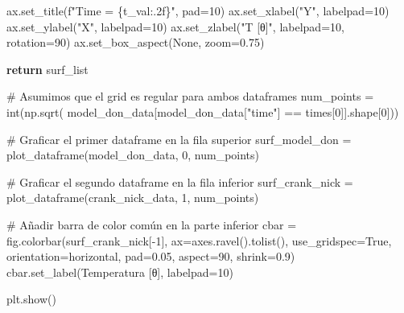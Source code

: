 \documentclass[
  spanish,
  us-letterpaper,
]{scrreprt}
\newenvironment{Shaded}{\begin{snugshade}}{\end{snugshade}}
\newcommand{\BuiltInTok}[1]{\textcolor[rgb]{0.00,0.23,0.31}{#1}}
\newcommand{\CommentTok}[1]{\textcolor[rgb]{0.37,0.37,0.37}{#1}}
\newcommand{\ControlFlowTok}[1]{\textcolor[rgb]{0.00,0.23,0.31}{\textbf{#1}}}
\newcommand{\DecValTok}[1]{\textcolor[rgb]{0.68,0.00,0.00}{#1}}
\newcommand{\FloatTok}[1]{\textcolor[rgb]{0.68,0.00,0.00}{#1}}
\newcommand{\NormalTok}[1]{\textcolor[rgb]{0.00,0.23,0.31}{#1}}
\newcommand{\OperatorTok}[1]{\textcolor[rgb]{0.37,0.37,0.37}{#1}}
\newcommand{\SpecialCharTok}[1]{\textcolor[rgb]{0.37,0.37,0.37}{#1}}
\newcommand{\SpecialStringTok}[1]{\textcolor[rgb]{0.13,0.47,0.30}{#1}}
\newcommand{\StringTok}[1]{\textcolor[rgb]{0.13,0.47,0.30}{#1}}
\newcommand{\VariableTok}[1]{\textcolor[rgb]{0.07,0.07,0.07}{#1}}
\theoremstyle{definition}
\theoremstyle{plain}
\theoremstyle{remark}
\begin{document}
\begin{Shaded}
\begin{Highlighting}[]
\NormalTok{        ax.set\_title(}\SpecialStringTok{f"Time = }\SpecialCharTok{\{}\NormalTok{t\_val}\SpecialCharTok{:.2f\}}\SpecialStringTok{"}\NormalTok{, pad}\OperatorTok{=}\DecValTok{10}\NormalTok{)}
\NormalTok{        ax.set\_xlabel(}\StringTok{"Y"}\NormalTok{, labelpad}\OperatorTok{=}\DecValTok{10}\NormalTok{)}
\NormalTok{        ax.set\_ylabel(}\StringTok{"X"}\NormalTok{, labelpad}\OperatorTok{=}\DecValTok{10}\NormalTok{)}
\NormalTok{        ax.set\_zlabel(}\StringTok{"T [θ]"}\NormalTok{, labelpad}\OperatorTok{=}\DecValTok{10}\NormalTok{, rotation}\OperatorTok{=}\DecValTok{90}\NormalTok{)}
\NormalTok{        ax.set\_box\_aspect(}\VariableTok{None}\NormalTok{, zoom}\OperatorTok{=}\FloatTok{0.75}\NormalTok{)}
    
    \ControlFlowTok{return}\NormalTok{ surf\_list}

\CommentTok{\# Asumimos que el grid es regular para ambos dataframes}
\NormalTok{num\_points }\OperatorTok{=} \BuiltInTok{int}\NormalTok{(np.sqrt(}
\NormalTok{        model\_don\_data[model\_don\_data[}\StringTok{"time"}\NormalTok{] }\OperatorTok{==}\NormalTok{ times[}\DecValTok{0}\NormalTok{]].shape[}\DecValTok{0}\NormalTok{]))}

\CommentTok{\# Graficar el primer dataframe en la fila superior}
\NormalTok{surf\_model\_don }\OperatorTok{=}\NormalTok{ plot\_dataframe(model\_don\_data, }\DecValTok{0}\NormalTok{, num\_points)}

\CommentTok{\# Graficar el segundo dataframe en la fila inferior}
\NormalTok{surf\_crank\_nick }\OperatorTok{=}\NormalTok{ plot\_dataframe(crank\_nick\_data, }\DecValTok{1}\NormalTok{, num\_points)}

\CommentTok{\# Añadir barra de color común en la parte inferior}
\NormalTok{cbar }\OperatorTok{=}\NormalTok{ fig.colorbar(surf\_crank\_nick[}\OperatorTok{{-}}\DecValTok{1}\NormalTok{], ax}\OperatorTok{=}\NormalTok{axes.ravel().tolist(),}
\NormalTok{                    use\_gridspec}\OperatorTok{=}\VariableTok{True}\NormalTok{, orientation}\OperatorTok{=}\StringTok{\textquotesingle{}horizontal\textquotesingle{}}\NormalTok{,}
\NormalTok{                    pad}\OperatorTok{=}\FloatTok{0.05}\NormalTok{, aspect}\OperatorTok{=}\DecValTok{90}\NormalTok{, shrink}\OperatorTok{=}\FloatTok{0.9}\NormalTok{)}
\NormalTok{cbar.set\_label(}\StringTok{\textquotesingle{}Temperatura [θ]\textquotesingle{}}\NormalTok{, labelpad}\OperatorTok{=}\DecValTok{10}\NormalTok{)}


\NormalTok{plt.show()}
\end{Highlighting}
\end{Shaded}
\end{document}
